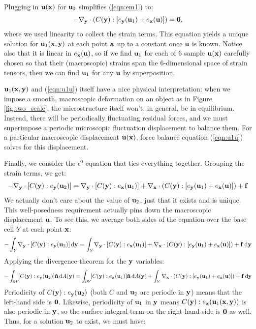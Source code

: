 \documentclass[10pt]{article}
\providecommand{\e}{\epsilon}
\begin{document}
Plugging in ${\bf u}({\bf x})$ for ${\bf u}_0$ simplifies (\ref{eqn:em1}) to:
\begin{equation}
    \label{eqn:u1u}
    -\nabla_{\bf y} \cdot (C({\bf y}) : [e_{\bf y}({\bf u}_1) + e_{\bf x}({\bf u})]) =  {\bf 0},
\end{equation}
where we used linearity to collect the strain terms. This equation yields a
unique solution for ${\bf u}_1({\bf x}, {\bf y})$ at each point ${\bf x}$ up to
a constant once ${\bf u}$ is known. Notice also that it is linear in $e_{\bf
x}({\bf u})$, so if we find ${\bf u}_1$ for each of 6 sample ${\bf u}({\bf x})$
carefully chosen so that their (macroscopic) strains span the 6-dimensional
space of strain tensors, then we can find ${\bf u}_1$ for any ${\bf u}$ by
superposition.

${\bf u}_1({\bf x}, {\bf y})$ and (\ref{eqn:u1u}) itself have a nice physical
interpretation: when we impose a smooth, macroscopic deformation on an object
as in Figure \ref{fig:two_scale}, the microstructure itself won't, in general,
be in equilibrium. Instead, there will be periodically fluctuating residual
forces, and we must superimpose a periodic microscopic fluctuation displacement
to balance them. For a particular macroscopic displacement ${\bf u}({\bf x})$,
force balance equation (\ref{eqn:u1u}) solves for this displacement.

Finally, we consider the $\e^0$ equation that ties everything together.
Grouping the strain terms, we get:
$$
 -\nabla_{\bf y} \cdot [C({\bf y}) : e_{\bf y}({\bf u}_2)] = 
                     \nabla_{\bf y} \cdot [C({\bf y}) : e_{\bf x}({\bf u}_1)] +
                     \nabla_{\bf x} \cdot (C({\bf y}) : [e_{\bf y}({\bf u}_1) + e_{\bf x}({\bf u})]) + {\bf f}
$$
We actually don't care about the value of ${\bf u}_2$, just that it exists and
is unique. This well-posedness requirement actually pins down the macroscopic
displacement ${\bf u}$. To see this, we average both sides of the equation
over the base cell $Y$ at each point ${\bf x}$:
$$
-\int_Y \! \nabla_{\bf y} \cdot [C({\bf y}) : e_{\bf y}({\bf u}_2)] \, \mathrm{d}{\bf y} = 
         \int_Y \!   \nabla_{\bf y} \cdot [C({\bf y}) : e_{\bf x}({\bf u}_1)] +
         \nabla_{\bf x} \cdot (C({\bf y}) : [e_{\bf y}({\bf u}_1) + e_{\bf x}({\bf u})]) + {\bf f} \, \mathrm{d} {\bf y}
$$
Applying the divergence theorem for the ${\bf y}$ variables:
$$
-\int_{\partial Y} \! [C({\bf y}) : e_{\bf y}({\bf u}_2)] {\bf \hat{n}} \, \mathrm{d}A({\bf y}) =
 \int_{\partial Y} \! [C({\bf y}) : e_{\bf x}({\bf u}_1)] {\bf \hat{n}} \, \mathrm{d}A({\bf y}) +
         \int_Y \nabla_{\bf x} \cdot (C({\bf y}) : [e_{\bf y}({\bf u}_1) + e_{\bf x}({\bf u})]) + {\bf f} \, \mathrm{d} {\bf y}
$$
Periodicity of $C({\bf y}) : e_{\bf y}({\bf u}_2)$ (both $C$ and ${\bf
u}_2$ are periodic in ${\bf y}$) means that the left-hand side is ${\bf 0}$.
Likewise, periodicity of ${\bf u}_1$ in ${\bf y}$ means $C({\bf y}) : e_{\bf x}({\bf
u}_1({\bf x}, {\bf y}))$ is also periodic in ${\bf y}$, so the surface integral
term on the right-hand side is ${\bf 0}$ as well. Thus, for a solution ${\bf
u}_2$ to exist, we must have:
\end{document}
